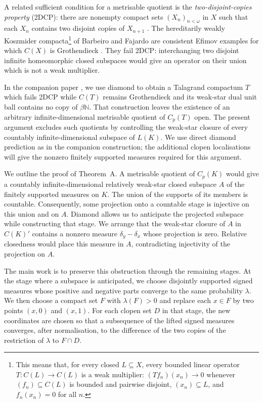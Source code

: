 \documentclass[a4paper,11pt]{amsart}
\theoremstyle{plain}
\theoremstyle{definition}
\theoremstyle{remark}
\newcommand{\N}{\mathbb N}
\numberwithin{equation}{section}
\begin{document}
A related sufficient condition for a metrisable quotient is the
\emph{two-disjoint-copies property} (2DCP): there are nonempty compact
sets $(X_n)_{n<\omega}$ in $X$ such that each $X_n$ contains two
disjoint copies of $X_{n+1}$ \cite[Theorem~2]{BKS2018}.
The hereditarily weakly Koszmider compacta\footnote{This means that,
for every closed $L\subseteq X$, every bounded linear operator
$T:C(L)\to C(L)$ is a weak multiplier: $(Tf_n)(x_n)\to0$ whenever
$(f_n)\subseteq C(L)$ is bounded and pairwise disjoint,
$(x_n)\subseteq L$, and $f_n(x_n)=0$ for all $n$.}
of Barbeiro and Fajardo \cite{BarbeiroFajardo} are consistent Efimov
examples for which $C(X)$ is Grothendieck
\cite[Theorem~2.4]{Koszmider}. They fail 2DCP: interchanging two
disjoint infinite homeomorphic closed subspaces would give an operator
on their union which is not a weak multiplier.

In the companion paper \cite{KaniaKakol2DCP}, we use diamond to obtain
a Talagrand compactum $T$ which fails 2DCP while $C(T)$ remains
Grothendieck and its weak-star dual unit ball contains no copy of
$\beta\N$. That construction leaves the existence of an arbitrary
infinite-dimensional metrisable quotient of $C_p(T)$ open.
The present argument excludes such quotients by controlling the
weak-star closure of every countably infinite-dimensional subspace
of $L(K)$. We use direct diamond prediction as in the companion
construction; the additional clopen localisations will give the
nonzero finitely supported measures required for this argument.

We outline the proof of Theorem~A. A metrisable quotient of $C_p(K)$
would give a countably infinite-dimensional relatively weak-star closed
subspace $A$ of the finitely supported measures on $K$. The union of the
supports of its members is countable. Consequently, some projection onto
a countable stage is injective on this union and on $A$.
Diamond allows us to anticipate the projected subspace while constructing
that stage. We arrange that the weak-star closure of $A$ in $C(K)'$
contains a nonzero measure $\delta_y-\delta_x$ whose projection is zero.
Relative closedness would place this measure in $A$, contradicting
injectivity of the projection on $A$.

The main work is to preserve this obstruction through the remaining
stages. At the stage where a subspace is anticipated, we choose disjointly
supported signed measures whose positive and negative parts converge to
the same probability $\lambda$. We then choose a compact set $F$ with
$\lambda(F)>0$ and replace each $x\in F$ by two points $(x,0)$ and $(x,1)$.
For each clopen set $D$ in that stage, the new coordinates are chosen so
that a subsequence of the lifted signed measures converges, after
normalisation, to the difference of the two copies of the restriction
of $\lambda$ to $F\cap D$.
\end{document}
